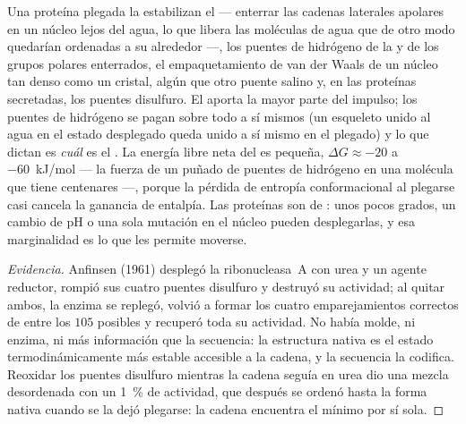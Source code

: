 \begin{proposition}\label{prop:b3:structural-biology:forces}
Una proteína plegada la estabilizan el \emph{} ---
enterrar las cadenas laterales apolares en un núcleo lejos del agua, lo
que libera las moléculas de agua que de otro modo quedarían ordenadas a
su alrededor ---, los puentes de hidrógeno de la  y
de los grupos polares enterrados, el empaquetamiento de van der Waals de
un núcleo tan denso como un cristal, algún que otro puente salino y, en
las proteínas secretadas, los puentes disulfuro. El 
aporta la mayor parte del impulso; los puentes de hidrógeno se pagan
sobre todo a sí mismos (un esqueleto unido al agua en el estado
desplegado queda unido a sí mismo en el plegado) y lo que dictan es
\emph{cuál} es el . La energía libre neta del  es
pequeña, $\Delta G \approx -20$ a \qty{-60}{kJ/mol} --- la fuerza de un
puñado de puentes de hidrógeno en una molécula que tiene centenares ---,
porque la pérdida de entropía conformacional al plegarse casi cancela la
ganancia de entalpía. Las proteínas son de \emph{}:
unos pocos grados, un cambio de pH o una sola mutación en el núcleo
pueden desplegarlas, y esa marginalidad es lo que les permite moverse.
\end{proposition}

\begin{proof}[Evidencia]
Anfinsen (1961) desplegó la ribonucleasa~A con urea y un agente reductor,
rompió sus cuatro puentes disulfuro y destruyó su actividad; al quitar
ambos, la enzima se replegó, volvió a formar los cuatro emparejamientos
correctos de entre los $105$ posibles y recuperó toda su actividad. No
había molde, ni enzima, ni más información que la secuencia: la
estructura nativa es el estado termodinámicamente más estable accesible a
la cadena, y la secuencia la codifica. Reoxidar los puentes disulfuro
mientras la cadena seguía en urea dio una mezcla desordenada con un
\qty{1}{\%} de actividad, que después se ordenó hasta la forma nativa
cuando se la dejó plegarse: la cadena encuentra el mínimo por sí sola.
\end{proof}

